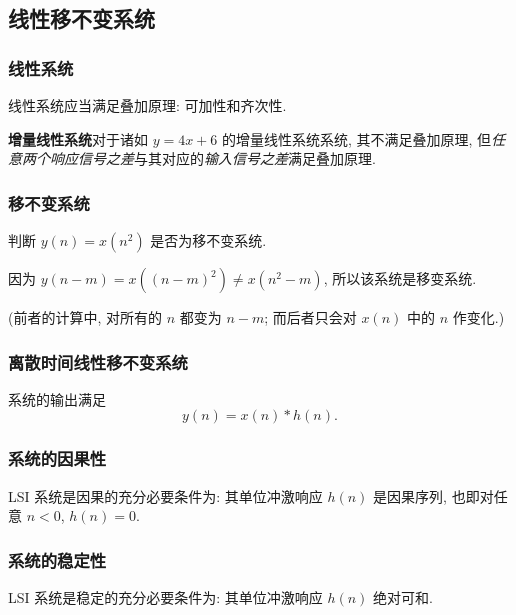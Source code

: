\subsection{线性移不变系统}
\subsubsection{线性系统}
线性系统应当满足叠加原理: 可加性和齐次性.

\textbf{增量线性系统}\quad 对于诸如 $y=4x+6$ 的增量线性系统系统, 其不满足叠加原理, 但\textit{任意两个响应信号之差}与其对应的\textit{输入信号之差}满足叠加原理.

\subsubsection{移不变系统}
\begin{exampleprob}
    判断 $y(n)=x(n^2)$ 是否为移不变系统.

    \begin{solution}
        因为 $y(n-m)=x((n-m)^2)\neq x(n^2-m)$, 所以该系统是移变系统.

        {\color{red} (前者的计算中, 对所有的 $n$ 都变为 $n-m$; 而后者只会对 $x(n)$ 中的 $n$ 作变化.)}
    \end{solution}
\end{exampleprob}

\subsubsection{离散时间线性移不变系统}
系统的输出满足
\begin{equation}
    y(n)=x(n)*h(n).
\end{equation}

\subsubsection{系统的因果性}
LSI 系统是因果的充分必要条件为: 其单位冲激响应 $h(n)$ 是因果序列, 也即对任意 $n<0$, $h(n)=0$.

\subsubsection{系统的稳定性}
LSI 系统是稳定的充分必要条件为: 其单位冲激响应 $h(n)$ 绝对可和.
